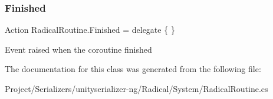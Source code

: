 \subsubsection{\texorpdfstring{Finished}{Finished}}
{\footnotesize\ttfamily Action Radical\+Routine.\+Finished = delegate \{ \}}



Event raised when the coroutine finished 



The documentation for this class was generated from the following file\+:\begin{DoxyCompactItemize}
\item 
Project/\+Serializers/unityserializer-\/ng/\+Radical/\+System/Radical\+Routine.\+cs\end{DoxyCompactItemize}
